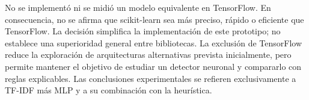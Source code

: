 No se implementó ni se midió un modelo equivalente en TensorFlow. En consecuencia, no se afirma que scikit-learn sea más preciso, rápido o eficiente que TensorFlow. La decisión simplifica la implementación de este prototipo; no establece una superioridad general entre bibliotecas. La exclusión de TensorFlow reduce la exploración de arquitecturas alternativas prevista inicialmente, pero permite mantener el objetivo de estudiar un detector neuronal y compararlo con reglas explicables. Las conclusiones experimentales se refieren exclusivamente a TF-IDF más MLP y a su combinación con la heurística.
